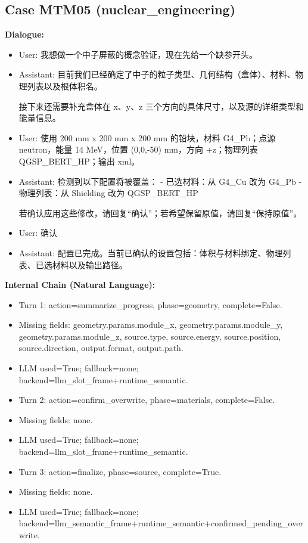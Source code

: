 \documentclass[11pt]{ctexart}
\begin{document}
\subsection{Case MTM05 (nuclear\_engineering)}
\textbf{Dialogue:}
\begin{itemize}
\item User: 我想做一个中子屏蔽的概念验证，现在先给一个缺参开头。
\item Assistant: 目前我们已经确定了中子的粒子类型、几何结构（盒体）、材料、物理列表以及根体积名。

接下来还需要补充盒体在 x、y、z 三个方向的具体尺寸，以及源的详细类型和能量信息。
\item User: 使用 200 mm x 200 mm x 200 mm 的铅块，材料 G4\_Pb；点源 neutron，能量 14 MeV，位置 (0,0,-50) mm，方向 +z；物理列表 QGSP\_BERT\_HP；输出 xml。
\item Assistant: 检测到以下配置将被覆盖：
- 已选材料：从 G4\_Cu 改为 G4\_Pb
- 物理列表：从 Shielding 改为 QGSP\_BERT\_HP

若确认应用这些修改，请回复“确认”；若希望保留原值，请回复“保持原值”。
\item User: 确认
\item Assistant: 配置已完成。当前已确认的设置包括：体积与材料绑定、物理列表、已选材料以及输出路径。
\end{itemize}
\textbf{Internal Chain (Natural Language):}
\begin{itemize}
\item Turn 1: action=summarize\_progress, phase=geometry, complete=False.
\item Missing fields: geometry.params.module\_x, geometry.params.module\_y, geometry.params.module\_z, source.type, source.energy, source.position, source.direction, output.format, output.path.
\item LLM used=True; fallback=none; backend=llm\_slot\_frame+runtime\_semantic.
\item Turn 2: action=confirm\_overwrite, phase=materials, complete=False.
\item Missing fields: none.
\item LLM used=True; fallback=none; backend=llm\_slot\_frame+runtime\_semantic.
\item Turn 3: action=finalize, phase=source, complete=True.
\item Missing fields: none.
\item LLM used=True; fallback=none; backend=llm\_semantic\_frame+runtime\_semantic+confirmed\_pending\_overwrite.
\end{itemize}
\end{document}
